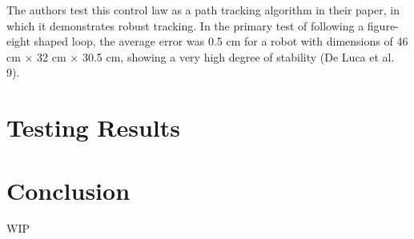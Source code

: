 \documentclass[mla7]{mla}
\begin{document}
\begin{paper}
The authors test this control law as a path tracking algorithm in their paper, in which it demonstrates robust tracking. In the primary test of following a figure-eight shaped loop, the average error was 0.5 cm for a robot with dimensions of 46 cm $\times$ 32 cm $\times$ 30.5 cm, showing a very high degree of stability (De Luca et al. 9). 

\section{Testing Results}



\section{Conclusion}

WIP

\end{paper}
\end{document}
